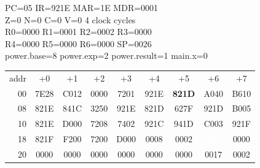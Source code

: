 \begin{tcolorbox}[stepbox, title={Step 9 \hfill PC 04 \quad ST R1, power.result}]
PC=05 IR=921E MAR=1E MDR=0001\\
Z=0 N=0 C=0 V=0 \hfill \textcolor{dim}{4 clock cycles}\\
R0=0000 R1=0001 R2=0002 R3=0000\\
R4=0000 R5=0000 R6=0000 SP=0026\\
\textcolor{dim}{power.base=8  power.exp=2  power.result=1  main.x=0}\\[1pt]
{\setlength{\tabcolsep}{1.6pt}\begin{tabular}{@{}r*{8}{c}@{}}
\textcolor{dim}{addr} & \textcolor{dim}{+0} & \textcolor{dim}{+1} & \textcolor{dim}{+2} & \textcolor{dim}{+3} & \textcolor{dim}{+4} & \textcolor{dim}{+5} & \textcolor{dim}{+6} & \textcolor{dim}{+7}\\
\textcolor{dim}{00} & 7E28 & C012 & 0000 & 7201 & 921E & \cellcolor{pcc}\textbf{821D} & A040 & B610\\
\textcolor{dim}{08} & 821E & 841C & 3250 & 921E & 821D & 627F & 921D & B005\\
\textcolor{dim}{10} & 821E & D000 & 7208 & 7402 & 921C & 941D & C003 & 921F\\
\textcolor{dim}{18} & 821F & F200 & 7200 & D000 & \cellcolor{datac}0008 & \cellcolor{datac}0002 & \cellcolor{wrt}\textcolor{white}{\textbf{0001}} & \cellcolor{datac}0000\\
\textcolor{dim}{20} & \cellcolor{stackc}0000 & \cellcolor{stackc}0000 & \cellcolor{stackc}0000 & \cellcolor{stackc}0000 & \cellcolor{stackc}0000 & \cellcolor{stackc}0000 & \cellcolor{stackc}0017 & \cellcolor{stackc}0002\\
\end{tabular}}
\end{tcolorbox}\par\vspace{3pt}
